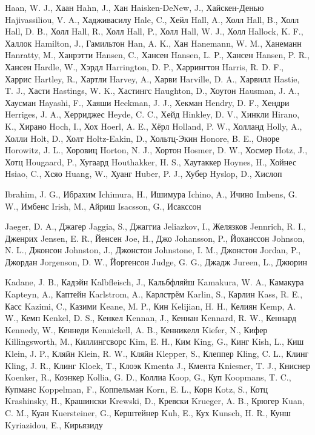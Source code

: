 Haan, W. J., Хаан
Hahn, J., Хан
Haisken-DeNew, J., Хайскен-Денью
Hajivassiliou, V. A., Хадживасилу
Hale, C., Хейл
Hall, A., Холл
Hall, B., Холл
Hall, D. B., Холл
Hall, R., Холл
Hall, P., Холл
Hall, W. J., Холл
Hallock, K. F., Халлок
Hamilton, J., Гамильтон
Han, A. K., Хан
Hanemann, W. M., Ханеманн
Hanratty, M., Ханрэтти
Hansen, C., Хансен
Hansen, L. P., Хансен 
Hansen, P. R., Хансен
Hardle, W., Хэрдл
Harrington, D. P., Харрингтон
Harris, R. D. F., Харрис
Hartley, R., Хартли
Harvey, A., Харви
Harville, D. A., Харвилл
Hastie, T. J., Хасти
Hastings, W. K., Хастингс
Haughton, D., Хоутон
Hausman, J. A., Хаусман
Hayashi, F., Хаяши
Heckman, J. J., Хекман 
Hendry, D. F., Хендри
Herriges, J. A., Херриджес
Heyde, C. C., Хейд
Hinkley, D. V., Хинкли
Hirano, K., Хирано
Hoch, I., Хох
Hoerl, A. E., Хёрл
Holland, P. W., Холланд 
Holly, A., Холли
Holt, D., Холт
Holtz-Eakin, D., Хольтц-Экин
Honore, B. E., Оноре
Horowitz, J. L., Хоровиц
Horton, N. J., Хортон
Hosmer, D. W., Хосмер
Hotz, J., Хотц
Hougaard, P., Хугаард
Houthakker, H. S., Хаутаккер
Hoynes, H., Хойнес
Hsiao, C., Хсяо 
Huang, W., Хуанг
Huber, P. J., Хубер 
Hyslop, D., Хислоп

Ibrahim, J. G., Ибрахим
Ichimura, H., Ишимура 
Ichino, A., Ичино
Imbens, G. W., Имбенс 
Irish, M., Айриш
Isacsson, G., Исакссон

Jaeger, D. A., Джагер
Jaggia, S., Джаггиа 
Jeliazkov, I., Желязков
Jennrich, R. I., Дженрих
Jensen, E. R., Йенсен
Joe, H., Джо
Johansson, P., Йоханссон 
Johnson, N. L., Джонсон
Johnston, J., Джонстон
Johnstone, I. M., Джонстон
Jordan, P., Джордан
Jorgenson, D. W., Йоргенсон
Judge, G. G., Джадж
Jureen, L., Джюрин

Kadane, J. B., Кадэйн
Kalbfleisch, J., Кальбфляйш
Kamakura, W. A., Камакура
Kapteyn, A., Каптейн
Karlstrom, A., Карлстрём
Karlin, S., Карлин
Kass, R. E., Касс
Kazimi, C., Казими
Keane, M. P., Кин
Kelijian, H. H., Келиян
Kemp, A. W., Кемп
Kenkel, D. S., Кенкел
Kennan, J., Кеннан
Kennard, R. W., Кеннард
Kennedy, W., Кеннеди
Kennickell, A. B., Кенникелл
Kiefer, N., Кифер 
Killingsworth, M., Киллингсворс
Kim, E. H., Ким
King, G., Кинг
Kish, L., Киш
Klein, J. P., Кляйн
Klein, R. W., Кляйн
Klepper, S., Клеппер
Kling, C. L., Клинг
Kling, J. R., Клинг
Kloek, T., Клоэк
Kmenta J., Кмента
Kniesner, T. J., Книснер
Koenker, R., Коэнкер
Kollia, G. D., Коллиа
Koop, G., Куп
Koopmans, T. C., Купманс
Koppelman, F., Коппельман
Korn, E. L., Корн
Kotz, S., Котц
Krashinsky, H., Крашински
Krewski, D., Кревски
Krueger, A. B., Крюгер 
Kuan, C. M., Куан
Kuersteiner, G., Керштейнер
Kuh, E., Кух
Kunsch, H. R., Кунш
Kyriazidou, E., Кирьязиду

